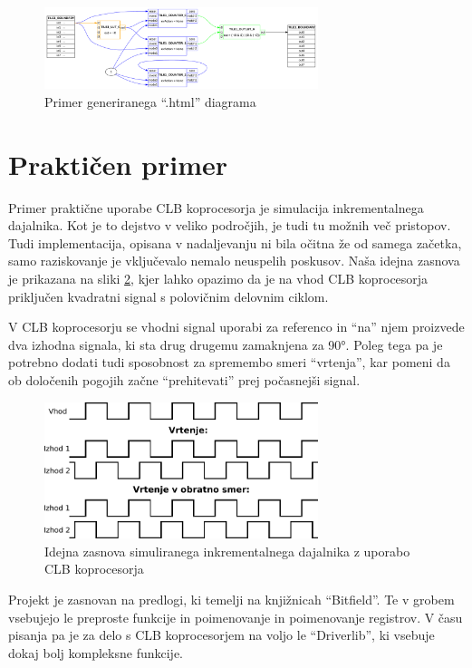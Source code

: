 \documentclass[a4paper]{article}
\begin{document}
\begin{figure}[htb]
    \centerline{\includegraphics[width=8cm]{html_diagram}}
    \caption{Primer generiranega ``.html'' diagrama}
    \label{fig:clbtool_diagram} 
\end{figure} 



\section{Praktičen primer}

Primer praktične uporabe CLB koprocesorja je simulacija inkrementalnega dajalnika. Kot je to dejstvo v veliko področjih, je tudi tu možnih več pristopov. Tudi implementacija, opisana v nadaljevanju ni bila očitna že od samega začetka, samo raziskovanje je vključevalo nemalo neuspelih poskusov. Naša idejna zasnova je prikazana na sliki \ref{fig:enkoder_zasnova}, kjer lahko opazimo da je na vhod CLB koprocesorja priključen kvadratni signal s polovičnim delovnim ciklom.

V CLB koprocesorju se vhodni signal uporabi za referenco in ``na'' njem proizvede dva izhodna signala, ki sta drug drugemu zamaknjena za 90°. Poleg tega pa je potrebno dodati tudi sposobnost za spremembo smeri ``vrtenja'', kar pomeni da ob določenih pogojih začne ``prehitevati'' prej počasnejši signal.

\begin{figure}[htb]
    \centerline{\includegraphics[width=8cm]{enkoder_zasnova}}
    \caption{Idejna zasnova simuliranega inkrementalnega dajalnika z uporabo CLB koprocesorja}
    \label{fig:enkoder_zasnova} 
\end{figure} 

Projekt je zasnovan na predlogi, ki temelji na knjižnicah ``Bitfield''. Te v grobem vsebujejo le preproste funkcije in poimenovanje in poimenovanje registrov. V času pisanja pa je za delo s CLB koprocesorjem na voljo le ``Driverlib'', ki vsebuje dokaj bolj kompleksne funkcije.
\end{document}
